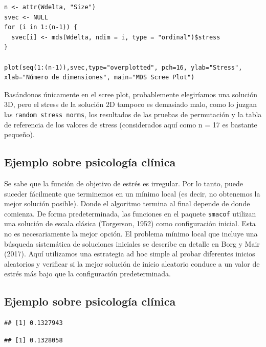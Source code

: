 \documentclass[]{article}
\begin{document}
\hypertarget{right}{}
\begin{verbatim}
n <- attr(Wdelta, "Size")
svec <- NULL
for (i in 1:(n-1)) {
  svec[i] <- mds(Wdelta, ndim = i, type = "ordinal")$stress
}

plot(seq(1:(n-1)),svec,type="overplotted", pch=16, ylab="Stress",
xlab="Número de dimensiones", main="MDS Scree Plot")
\end{verbatim}

Basándonos únicamente en el scree plot, probablemente elegiríamos una
solución 3D, pero el stress de la solución 2D tampoco es demasiado malo,
como lo juzgan las \texttt{random\ stress\ norms}, los resultados de las
pruebas de permutación y la tabla de referencia de los valores de stress
(considerados aquí como n = 17 es bastante pequeño).

\subsection{Ejemplo sobre psicología
clínica}\label{ejemplo-sobre-psicologuxeda-cluxednica-9}

Se sabe que la función de objetivo de estrés es irregular. Por lo tanto,
puede suceder fácilmente que terminemos en un mínimo local (es decir, no
obtenemos la mejor solución posible). Donde el algoritmo termina al
final depende de donde comienza. De forma predeterminada, las funciones
en el paquete \texttt{smacof} utilizan una solución de escala clásica
(Torgerson, 1952) como configuración inicial. Esta no es necesariamente
la mejor opción. El problema mínimo local que incluye una búsqueda
sistemática de soluciones iniciales se describe en detalle en Borg y
Mair (2017). Aquí utilizamos una estrategia ad hoc simple al probar
diferentes inicios aleatorios y verificar si la mejor solución de inicio
aleatorio conduce a un valor de estrés más bajo que la configuración
predeterminada.

\subsection{Ejemplo sobre psicología
clínica}\label{ejemplo-sobre-psicologuxeda-cluxednica-10}

\hypertarget{left}{}
\begin{verbatim}
## [1] 0.1327943
\end{verbatim}

\begin{verbatim}
## [1] 0.1328058
\end{verbatim}
\end{document}
